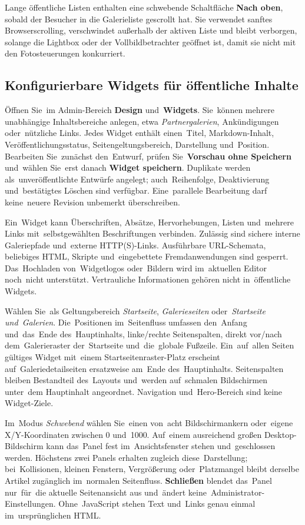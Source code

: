 \documentclass[11pt,a4paper]{article}
\newcommand{\ui}[1]{\textbf{#1}}
\begin{document}
Lange öffentliche Listen enthalten eine schwebende Schaltfläche \ui{Nach oben},
sobald der Besucher in die Galerieliste gescrollt hat. Sie verwendet sanftes
Browserscrolling, verschwindet außerhalb der aktiven Liste und bleibt verborgen,
solange die Lightbox oder der Vollbildbetrachter geöffnet ist, damit sie nicht
mit den Fotosteuerungen konkurriert.

\subsection{Konfigurierbare Widgets für öffentliche Inhalte}

Öffnen Sie~im Admin-Bereich \ui{Design} und~\ui{Widgets}. Sie~können mehrere
unabhängige Inhaltsbereiche anlegen, etwa \emph{Partnergalerien}, Ankündigungen
oder~nützliche Links. Jedes Widget enthält einen~Titel, Markdown-Inhalt,
Veröffentlichungsstatus, Seitengeltungsbereich, Darstellung und~Position.
Bearbeiten Sie~zunächst den~Entwurf, prüfen Sie~\ui{Vorschau ohne Speichern}
und~wählen Sie~erst danach \ui{Widget speichern}. Duplikate werden
als~unveröffentlichte Entwürfe angelegt; auch~Reihenfolge, Deaktivierung
und~bestätigtes Löschen sind verfügbar. Eine~parallele Bearbeitung darf
keine~neuere Revision unbemerkt überschreiben.

Ein~Widget kann Überschriften, Absätze, Hervorhebungen, Listen und~mehrere Links
mit~selbstgewählten Beschriftungen verbinden. Zulässig sind sichere interne
Galeriepfade und~externe HTTP(S)-Links. Ausführbare URL-Schemata, beliebiges
HTML, Skripte und~eingebettete Fremdanwendungen sind gesperrt. Das~Hochladen
von~Widgetlogos oder~Bildern wird im~aktuellen Editor noch~nicht unterstützt.
Vertrauliche Informationen gehören nicht in~öffentliche Widgets.

Wählen Sie~als Geltungsbereich \emph{Startseite}, \emph{Galerieseiten}
oder~\emph{Startseite und~Galerien}. Die~Positionen im~Seitenfluss umfassen
den~Anfang und~das~Ende des~Hauptinhalts, linke/rechte Seitenspalten, direkt
vor/nach dem~Galerieraster der~Startseite und~die~globale Fußzeile.
Ein~auf~allen Seiten gültiges Widget mit~einem Startseitenraster-Platz erscheint
auf~Galeriedetailseiten ersatzweise am~Ende des~Hauptinhalts. Seitenspalten
bleiben Bestandteil des~Layouts und~werden auf~schmalen Bildschirmen unter~dem
Hauptinhalt angeordnet. Navigation und~Hero-Bereich sind keine Widget-Ziele.

Im~Modus \emph{Schwebend} wählen Sie~einen von~acht Bildschirmankern oder~eigene
X/Y-Koordinaten zwischen 0 und~1000. Auf~einem ausreichend großen
Desktop-Bildschirm kann das~Panel fest im~Ansichtsfenster stehen und~geschlossen
werden. Höchstens zwei Panels erhalten zugleich diese~Darstellung;
bei~Kollisionen, kleinen Fenstern, Vergrößerung oder~Platzmangel bleibt derselbe
Artikel zugänglich im~normalen Seitenfluss. \ui{Schließen} blendet das~Panel
nur~für~die aktuelle Seitenansicht aus und~ändert
keine~Administrator-Einstellungen. Ohne~JavaScript stehen Text und~Links genau
einmal im~ursprünglichen HTML.
\end{document}

